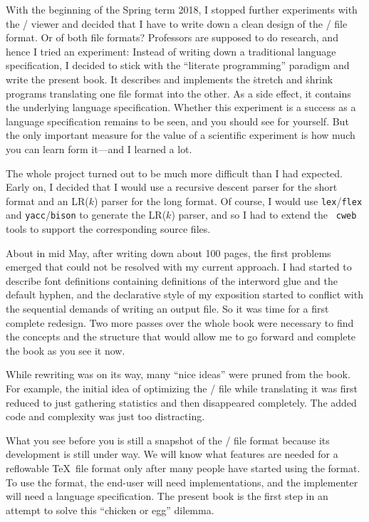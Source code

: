 With the beginning of the Spring term 2018, I stopped further
experiments with the \HINT/ viewer and decided that I have to write
down a clean design of the \HINT/ file format. Or of both file
formats?  Professors are supposed to do research, and hence I tried an
experiment: Instead of writing down a traditional language
specification, I decided to stick with the ``literate programming''
paradigm\cite{Knuth:lp} and write the present book.  It describes and implements
the \.{stretch} and \.{shrink} programs translating one file format
into the other.  As a side effect, it contains the underlying language
specification. Whether this experiment is a success as a language
specification remains to be seen, and you should see for yourself. But
the only important measure for the value of a scientific experiment is
how much you can learn form it---and I learned a lot.

The whole project turned out to be much more difficult than I had
expected.  Early on, I decided that I would use a recursive descent
parser for the short format and an LR($k$) parser for the long
format. Of course, I would use {\tt lex}/{\tt flex} and {\tt yacc}/{\tt bison}
to generate the LR($k$) parser, and so I had to extend the {\tt
cweb} tools\cite{Knuth:cweb} to support the corresponding source files.

About in mid May, after writing down about 100 pages, the first
problems emerged that could not be resolved with my current
approach. I had started to describe font definitions containing
definitions of the interword glue and the default hyphen, and the
declarative style of my exposition started to conflict with the
sequential demands of writing an output file. So it was time for a
first complete redesign.  Two more passes over the whole book were
necessary to find the concepts and the structure that would allow me
to go forward and complete the book as you see it now.

While rewriting was on its way, many ``nice ideas'' were pruned from
the book. For example, the initial idea of optimizing the \HINT/ file
while translating it was first reduced to just gathering statistics
and then disappeared completely.  The added code and complexity was
just too distracting.

What you see before you is still a snapshot of the \HINT/ file format
because its development is still under way.  We will know what
features are needed for a reflowable \TeX\ file format only after many
people have started using the format. To use the format, the end-user
will need implementations, and the implementer will need a language
specification.  The present book is the first step in an attempt to
solve this ``chicken or egg'' dilemma.


